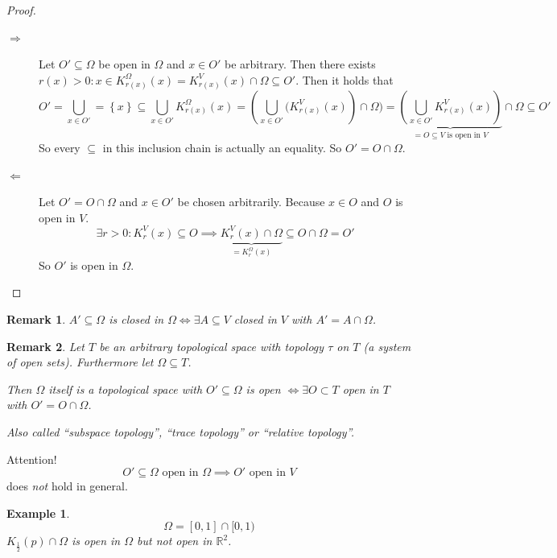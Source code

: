 \documentclass{article}
\newtheorem{example}{Example}  \numberwithin{example}{section}
\newtheorem{remark}{Remark}  \numberwithin{remark}{section}
\newcommand{\set}[1]{\left\{#1\right\}}
\begin{document}
\begin{proof}
  \begin{description}
    \item[$\Rightarrow$]
      Let $O' \subseteq \Omega$ be open in $\Omega$ and $x \in O'$ be arbitrary.
      Then there exists $r(x) > 0: x \in K_{r(x)}^\Omega(x) = K_{r(x)}^V(x) \cap \Omega \subseteq O'$.
      Then it holds that
      \[
        O' = \bigcup_{x \in O'} = \set{x} \subseteq \bigcup_{x \in O'} K_{r(x)}^\Omega(x)
        = \left(\bigcup_{x \in O'} (K_{r(x)}^V(x)\right) \cap \Omega)
        = \underbrace{\left(\bigcup_{x \in O'} K_{r(x)}^V(x)\right)}_{= O \subseteq V \text{ is open in } V} \cap \Omega
        \subseteq O'
      \]
      So every $\subseteq$ in this inclusion chain is actually an equality. So $O' = O \cap \Omega$.

    \item[$\Leftarrow$]
      Let $O' = O \cap \Omega$ and $x \in O'$ be chosen arbitrarily.
      Because $x \in O$ and $O$ is open in $V$.
      \[ \exists r > 0: K_r^V(x) \subseteq O \implies \underbrace{K_r^V(x) \cap \Omega}_{= K_r^\Omega(x)} \subseteq O \cap \Omega = O' \]
      So $O'$ is open in $\Omega$.
  \end{description}
\end{proof}

\begin{remark}
  $A' \subseteq \Omega$ is closed in $\Omega \iff \exists A \subseteq V$ closed in $V$ with $A' = A \cap \Omega$.
\end{remark}

\begin{remark}
  Let $T$ be an arbitrary topological space with topology $\tau$ on $T$ (a system of open sets).
  Furthermore let $\Omega \subseteq T$.

  Then $\Omega$ itself is a topological space with $O' \subseteq \Omega$ is open $\iff \exists O \subset T$ open in $T$ with $O' = O \cap \Omega$.

  Also called \enquote{subspace topology}, \enquote{trace topology} or \enquote{relative topology}.
\end{remark}

Attention!
\[ O' \subseteq \Omega \text{ open in } \Omega \implies O' \text{ open in } V \]
does \emph{not} hold in general.

\begin{example}
  \[ \Omega = [0,1] \cap [0,1) \]
  $K_{\frac12}(p) \cap \Omega$ is open in $\Omega$ but not open in $\mathbb R^2$.
\end{example}
\end{document}
